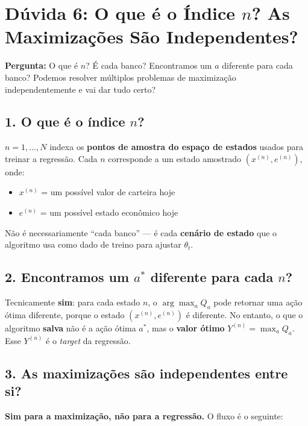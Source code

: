 \documentclass[12pt,a4paper]{article}
\begin{document}
\section{Dúvida 6: O que é o Índice \texorpdfstring{$n$}{n}? As Maximizações São Independentes?}

\textbf{Pergunta:} O que é $n$? É cada banco? Encontramos um $a$ diferente para cada banco? Podemos resolver múltiplos problemas de maximização independentemente e vai dar tudo certo?

\subsection{1. O que é o índice \texorpdfstring{$n$}{n}?}

$n = 1, \ldots, N$ indexa os \textbf{pontos de amostra do espaço de estados} usados para treinar a regressão. Cada $n$ corresponde a um estado amostrado $(x^{(n)}, e^{(n)})$, onde:
\begin{itemize}
    \item $x^{(n)}$ = um possível valor de carteira hoje
    \item $e^{(n)}$ = um possível estado econômico hoje
\end{itemize}

Não é necessariamente ``cada banco'' --- é cada \textbf{cenário de estado} que o algoritmo usa como dado de treino para ajustar $\theta_t$.

\subsection{2. Encontramos um \texorpdfstring{$a^*$}{a*} diferente para cada \texorpdfstring{$n$}{n}?}

Tecnicamente \textbf{sim}: para cada estado $n$, o $\arg\max_a Q_a$ pode retornar uma ação ótima diferente, porque o estado $(x^{(n)}, e^{(n)})$ é diferente. No entanto, o que o algoritmo \textbf{salva} não é a ação ótima $a^*$, mas o \textbf{valor ótimo} $Y^{(n)} = \max_a Q_a$. Esse $Y^{(n)}$ é o \textit{target} da regressão.

\subsection{3. As maximizações são independentes entre si?}

\textbf{Sim para a maximização, não para a regressão.} O fluxo é o seguinte:
\end{document}
